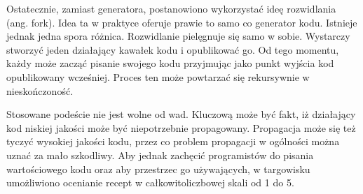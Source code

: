 \documentclass[11pt,a4paper,polish,thesis]{dcsbook}
\begin{document}
Ostatecznie, zamiast generatora, postanowiono wykorzystać ideę rozwidlania (ang. fork). Idea ta w praktyce oferuje prawie to samo co generator kodu. Istnieje jednak
jedna spora różnica. Rozwidlanie pielęgnuje się samo w sobie. Wystarczy stworzyć jeden działający kawałek kodu i opublikować go. Od tego momentu, każdy może zacząć pisanie swojego kodu przyjmując jako punkt wyjścia kod opublikowany wcześniej. Proces ten może powtarzać się rekursywnie w nieskończoność.

Stosowane podeście nie jest wolne od wad. Kluczową może być fakt, iż działający kod niskiej jakości może być niepotrzebnie propagowany. Propagacja może się też tyczyć
wysokiej jakości kodu, przez co problem propagacji w ogólności można uznać za mało szkodliwy. Aby jednak zachęcić programistów do pisania wartościowego kodu oraz
aby przestrzec go używających, w targowisku umożliwiono ocenianie recept w całkowitoliczbowej skali od 1 do 5.
\end{document}
